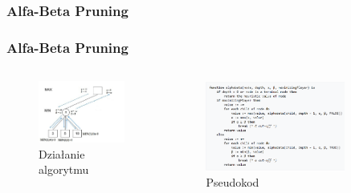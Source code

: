 \documentclass[polish,envcountsect,10pt]{beamer}
\begin{document}
            \subsubsection{Alfa-Beta Pruning}
                \begin{frame}
                    \frametitle{Alfa-Beta Pruning}
                    \begin{columns}
                        \begin{figure}[]
                            \centering
                            \includegraphics[width=\textwidth]{images/ab}
                            \caption{Działanie algorytmu}
                        \end{figure}
                        \begin{figure}[]
                            \centering
                            \includegraphics[width=0.8\textwidth]{images/ab_code}
                            \caption{Pseudokod}
                        \end{figure}
                    \end{columns}
                \end{frame}
            
\end{document}
